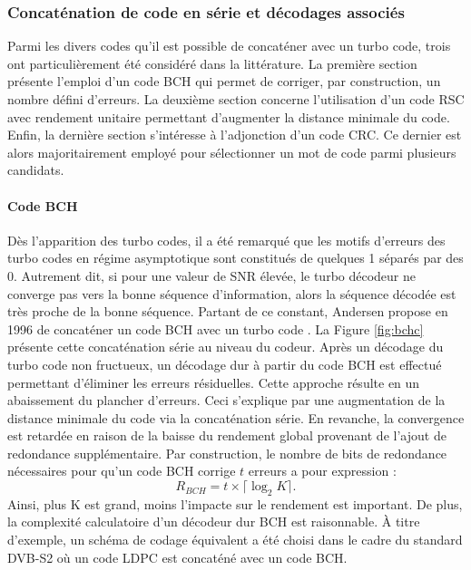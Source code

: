 
\subsubsection{Concaténation de code en série et décodages associés}
Parmi les divers codes qu'il est possible de concaténer avec un turbo code, trois ont particulièrement été considéré 
dans la littérature. La première section présente l'emploi d'un code BCH qui permet de corriger, par construction, un 
nombre défini d'erreurs. La deuxième section concerne l'utilisation d'un code RSC avec rendement unitaire permettant 
d'augmenter la distance minimale du code. Enfin, la dernière section s'intéresse à l'adjonction d'un code CRC. Ce 
dernier est alors majoritairement employé pour sélectionner un mot de code parmi plusieurs candidats.
\paragraph{Code BCH}
Dès l'apparition des turbo codes, il a été remarqué que les motifs d'erreurs des turbo codes en régime asymptotique sont 
constitués de quelques 1 séparés par des 0. Autrement dit, si pour une valeur de SNR élevée, le turbo décodeur ne 
converge pas vers la bonne séquence d'information, alors la séquence décodée est très proche de la bonne séquence. 
Partant de ce constant, Andersen propose en 1996 de concaténer un code BCH avec un turbo code \cite{andersenBCH}. La 
Figure \ref{fig:bchc} présente cette concaténation série au niveau du codeur. Après un décodage du turbo code non 
fructueux, un décodage dur à partir du code BCH est effectué permettant d'éliminer les erreurs résiduelles. Cette 
approche résulte en un abaissement du plancher d'erreurs. Ceci s'explique par une augmentation de la distance minimale 
du code via la concaténation série. En revanche, la convergence est retardée en raison de la baisse du rendement global 
provenant de l'ajout de redondance supplémentaire. Par construction, le nombre de bits de redondance nécessaires pour 
qu'un code BCH corrige $t$ erreurs a pour expression : \[R_{BCH} = t \times \lceil \log_2 K\rceil.\]
Ainsi, plus K est grand, moins l'impacte sur le rendement est important. De plus, la complexité calculatoire d'un 
décodeur dur BCH est raisonnable. À titre d'exemple, un schéma de codage équivalent a été choisi dans le cadre du 
standard DVB-S2 où  un code LDPC est concaténé avec un code BCH.

